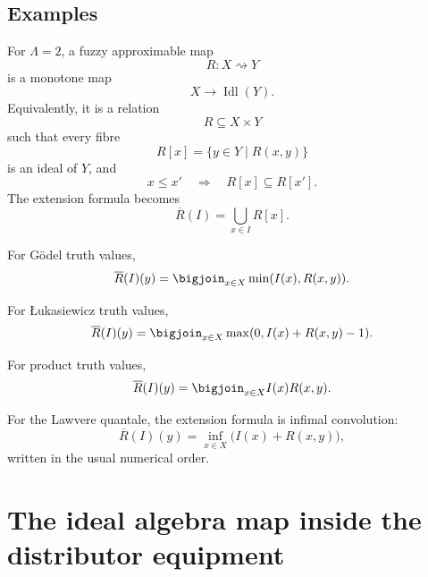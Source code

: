 \subsection{Examples}
\label{subsec:ideals-as-distributors-examples}

\begin{example}
\label{ex:ideals-as-distributors-crisp}
For \(\Lambda=2\), a fuzzy approximable map
\[
    R:X\rightsquigarrow Y
\]
is a monotone map
\[
    X\to\operatorname{Idl}(Y).
\]
Equivalently, it is a relation
\[
    R\subseteq X\times Y
\]
such that every fibre
\[
    R[x]=\{y\in Y\mid R(x,y)\}
\]
is an ideal of \(Y\), and
\[
    x\leq x'
    \quad\Longrightarrow\quad
    R[x]\subseteq R[x'].
\]
The extension formula becomes
\[
    \overline R(I)=\bigcup_{x\in I}R[x].
\]
\end{example}

\begin{example}
\label{ex:ideals-as-distributors-godel}
For G\"odel truth values,
\[
    \overline R(I)(y)
    =
    \bigjoin_{x\in X}
    \min(I(x),R(x,y)).
\]
\end{example}

\begin{example}
\label{ex:ideals-as-distributors-lukasiewicz}
For {\L}ukasiewicz truth values,
\[
    \overline R(I)(y)
    =
    \bigjoin_{x\in X}
    \max(0,I(x)+R(x,y)-1).
\]
\end{example}

\begin{example}
\label{ex:ideals-as-distributors-product}
For product truth values,
\[
    \overline R(I)(y)
    =
    \bigjoin_{x\in X}
    I(x)R(x,y).
\]
\end{example}

\begin{example}
\label{ex:ideals-as-distributors-lawvere}
For the Lawvere quantale, the extension formula is infimal convolution:
\[
    \overline R(I)(y)
    =
    \inf_{x\in X}
    \bigl(I(x)+R(x,y)\bigr),
\]
written in the usual numerical order.
\end{example}

\section{The ideal algebra map inside the distributor equipment}
\label{sec:ideal-algebra-map-equipment}

